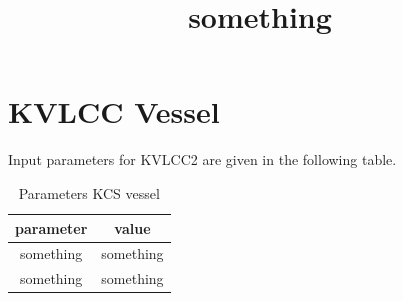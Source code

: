 \section{KVLCC Vessel}
Input parameters for KVLCC2 are given in the following table.
\begin{table}[H]
    \centering
    \begin{tabular}{|c|c|}
        \hline
        parameter & value \\ 
        \hline
        \title{something}
        something & something \\
        something & something \\
        \hline
    \end{tabular}
    \caption{Parameters KCS vessel}
    \label{tab:kvlcc2_inp}
\end{table}